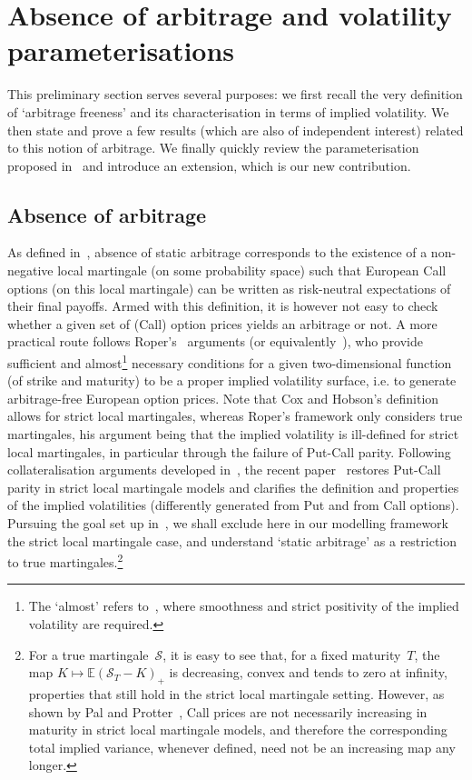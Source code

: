 \documentclass{amsart}[11pt]
\numberwithin{equation}{section}
\theoremstyle{definition}
\newcommand{\Ss}{\mathcal{S}}
\newcommand{\EE}{\mathbb{E}}
\begin{document}
\section{Absence of arbitrage and volatility parameterisations}\label{sec:Arbitrage}
This preliminary section serves several purposes: 
we first recall the very definition of `arbitrage freeness' and its characterisation in terms of implied volatility.
We then state and prove a few results (which are also of independent interest) related to this notion of arbitrage.
We finally quickly review the parameterisation proposed in~\cite{gj} and introduce an extension, which is our new contribution.

\subsection{Absence of arbitrage}
As defined in~\cite{Cox}, absence of static arbitrage corresponds to the existence of a non-negative local martingale 
(on some probability space) such that European Call options (on this local martingale) 
can be written as risk-neutral expectations of their final payoffs.
Armed with this definition, it is however not easy to check whether a given set of (Call) option prices
yields an arbitrage or not.
A more practical route follows Roper's~\cite{roper} arguments (or equivalently~\cite{gj}), 
who provide sufficient and almost\footnote{The `almost' refers to~\cite[Theorem 2.15]{roper},
where smoothness and strict positivity of the implied volatility are required.} necessary conditions for a given two-dimensional function 
(of strike and maturity) to be a proper implied volatility surface, i.e. to generate arbitrage-free European option prices.
Note that Cox and Hobson's definition~\cite{Cox} allows for strict local martingales, 
whereas Roper's framework only considers true martingales, his argument being that the implied volatility
is ill-defined for strict local martingales, in particular through the failure of Put-Call parity.
Following collateralisation arguments developed in~\cite{Cox}, the recent paper~\cite{JacquierKR}
restores Put-Call parity in strict local martingale models 
and clarifies the definition and properties of the implied volatilities 
(differently generated from Put and from Call options).
Pursuing the goal set up in~\cite{gj}, we shall exclude here in our modelling framework the strict local martingale case,
and understand `static arbitrage' as a restriction to true martingales.\footnote{For 
a true martingale~$\Ss$, 
it is easy to see that, for a fixed maturity~$T$, 
the map $K\mapsto \EE(\Ss_T - K)_+$ is decreasing, convex and tends to zero at infinity, 
properties that still hold in the strict local martingale setting.
However, as shown by Pal and Protter~\cite{Pal}, Call prices are not necessarily increasing in maturity
in strict local martingale models, and therefore the corresponding total implied variance, 
whenever defined, need not be an increasing map any longer.}
\end{document}
